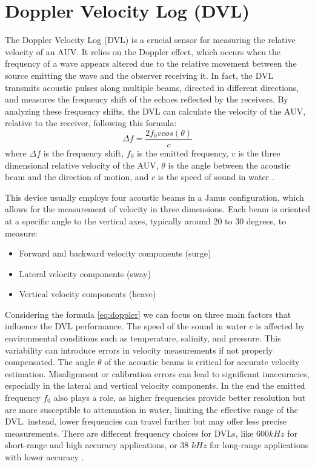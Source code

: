 \section{Doppler Velocity Log (DVL)}
The Doppler Velocity Log (DVL) is a crucial sensor for measuring the relative velocity of an AUV. 
It relies on the Doppler effect, which occurs when the frequency of a wave appears altered due to the relative movement between the source emitting the wave and the 
observer receiving it. In fact, the DVL transmits acoustic pulses along multiple beams, directed in different directions, and measures the frequency shift of the 
echoes reflected by the receivers. By analyzing these frequency shifts, the DVL can calculate the velocity of the AUV, relative to the receiver, following this formula:
\begin{equation}
    \Delta f = \frac{2 f_0 v cos(\theta)}{c}
    \label{eq:doppler}
\end{equation}
where $\Delta f$ is the frequency shift, $f_0$ is the emitted frequency, $v$ is the three dimensional relative velocity of the AUV, $\theta$ is the angle between the acoustic beam and 
the direction of motion, and $c$ is the speed of sound in water \cite{annapurnaEnhancingAccuracyDoppler2024}.

This device usually employs four acoustic beams in a Janus configuration, which allows for the measurement of velocity in three dimensions. Each beam is 
oriented at a specific angle to the vertical axes, typically around 20 to 30 degrees, to measure:
\begin{itemize}
    \item Forward and backward velocity components (surge)
    \item Lateral velocity components (sway)
    \item Vertical velocity components (heave)
\end{itemize}
Considering the formula \ref{eq:doppler} we can focus on three main factors that influence the DVL performance. The speed of the sound in water $c$ 
is affected by environmental conditions such as temperature, salinity, and pressure. This variability can introduce errors in velocity measurements if not properly compensated.
The angle $\theta$ of the acoustic beams is critical for accurate velocity estimation. Misalignment or calibration errors can lead to significant inaccuracies, especially in the 
lateral and vertical velocity components.
In the end the emitted frequency $f_0$ also plays a role, as higher frequencies provide better resolution but are more susceptible to attenuation in water, limiting the effective range of the DVL.
instead, lower frequencies can travel further but may offer less precise measurements. There are different frequency choices for DVLs, like 600$kHz$ for short-range and high accuracy applications, or
38 $kHz$ for long-range applications with lower accuracy \cite{sarangapaniMultifrequencyPhasedArray2022}.

